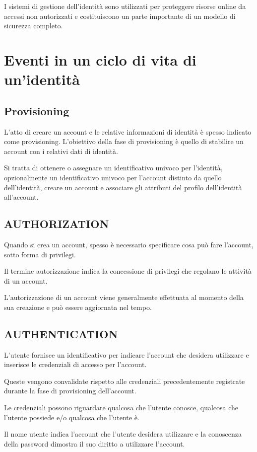 I sistemi di gestione dell'identità sono utilizzati per proteggere risorse online da accessi non autorizzati e costituiscono un parte importante di un modello di sicurezza completo. 

\section{Eventi in un ciclo di vita di un'identità}
\subsection{Provisioning}
L'atto di creare un account e le relative informazioni di identità  è spesso indicato come provisioning. L'obiettivo della fase di provisioning è quello di stabilire un account con i relativi dati di identità.

Si tratta di ottenere o assegnare un identificativo univoco per l'identità, opzionalmente un identificativo univoco per l'account distinto da quello dell'identità, creare un account e associare gli attributi del profilo dell'identità all'account.

\subsection{AUTHORIZATION}

Quando si crea un account, spesso è necessario specificare cosa può fare l'account, sotto forma di privilegi.

Il termine autorizzazione indica la concessione di privilegi che regolano le attività di un account.

L'autorizzazione di un account viene generalmente effettuata al momento della sua creazione e può essere aggiornata nel tempo. 

\subsection{AUTHENTICATION}

L'utente fornisce un identificativo per indicare l'account che desidera utilizzare e inserisce le credenziali di accesso per l'account.

Queste vengono convalidate rispetto alle credenziali precedentemente registrate durante la fase di provisioning dell'account.

Le credenziali possono riguardare qualcosa che l'utente conosce, qualcosa che l'utente possiede e/o qualcosa che l'utente è.

Il nome utente indica l'account che l'utente desidera utilizzare e la conoscenza della password dimostra il suo diritto a utilizzare l'account. 

